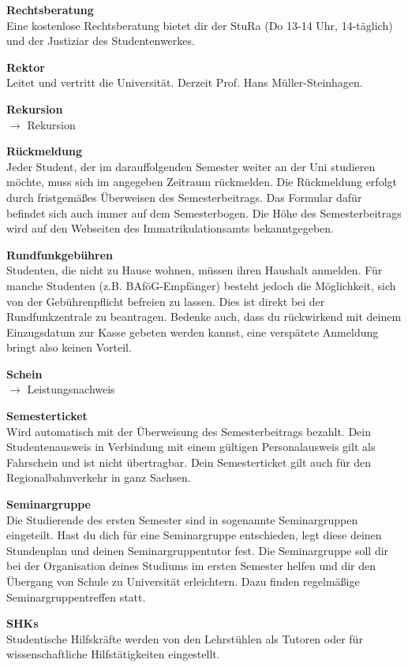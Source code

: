 \textbf{Rechtsberatung} \\
Eine kostenlose Rechtsberatung bietet dir der StuRa (Do 13-14 Uhr, 14-täglich) und der Justiziar des Studentenwerkes.

\textbf{Rektor} \\
Leitet und vertritt die Universität.
Derzeit Prof. Hans Müller-Steinhagen.

\textbf{Rekursion} \\
$\rightarrow$ Rekursion

\textbf{Rückmeldung} \\
Jeder Student, der im darauffolgenden Semester weiter an der Uni studieren möchte, muss sich im angegeben Zeitraum rückmelden.
Die Rückmeldung erfolgt durch fristgemäßes Überweisen des Semesterbeitrags.
Das Formular dafür befindet sich auch immer auf dem Semesterbogen.
Die Höhe des Semesterbeitrags wird auf den Webseiten des Immatrikulationsamts bekanntgegeben.

\textbf{Rundfunkgebühren} \\
Studenten, die nicht zu Hause wohnen, müssen ihren Haushalt anmelden.
Für manche Studenten (z.B. BAföG-Empfänger) besteht jedoch die Möglichkeit, sich von der Gebührenpflicht befreien zu lassen.
Dies ist direkt bei der Rundfunkzentrale zu beantragen.
Bedenke auch, dass du rückwirkend mit deinem Einzugsdatum zur Kasse gebeten werden kannst, eine verspätete Anmeldung bringt also keinen Vorteil.

\textbf{Schein} \\
$\rightarrow$ Leistungsnachweis

\textbf{Semesterticket} \\
Wird automatisch mit der Überweisung des Semesterbeitrags bezahlt.
Dein Studentenausweis in Verbindung mit einem gültigen Personalausweis gilt als Fahrschein und ist nicht übertragbar.
Dein Semesterticket gilt auch für den Regionalbahnverkehr in ganz Sachsen.

\textbf{Seminargruppe} \\
Die Studierende des ersten Semester sind in sogenannte Seminargruppen eingeteilt. Hast du dich für eine Seminargruppe entschieden, legt diese deinen Stundenplan und deinen Seminargruppentutor fest. Die Seminargruppe soll dir bei der Organisation deines Studiums im ersten Semester helfen und dir den Übergang von Schule zu Universität erleichtern. Dazu finden regelmäßige Seminargruppentreffen statt. 

\textbf{SHKs} \\
Studentische Hilfskräfte werden von den Lehrstühlen als Tutoren oder für wissenschaftliche Hilfstätigkeiten eingestellt.

